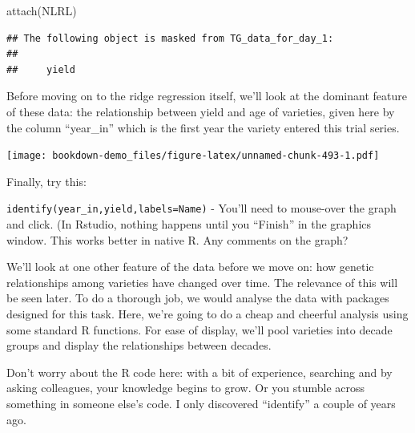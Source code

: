 \documentclass[
]{book}
\newenvironment{Shaded}{\begin{snugshade}}{\end{snugshade}}
\newcommand{\CommentTok}[1]{\textcolor[rgb]{0.56,0.35,0.01}{\textit{#1}}}
\newcommand{\FunctionTok}[1]{\textcolor[rgb]{0.00,0.00,0.00}{#1}}
\newcommand{\NormalTok}[1]{#1}
\newcommand{\SpecialCharTok}[1]{\textcolor[rgb]{0.00,0.00,0.00}{#1}}
\begin{document}
\begin{Shaded}
\begin{Highlighting}[]
\FunctionTok{attach}\NormalTok{(NLRL)}
\end{Highlighting}
\end{Shaded}

\begin{verbatim}
## The following object is masked from TG_data_for_day_1:
## 
##     yield
\end{verbatim}

Before moving on to the ridge regression itself, we'll look at the dominant feature of these data: the relationship between yield and age of varieties, given here by the column ``year\_in'' which is the first year the variety entered this trial series.

\begin{Shaded}
\end{Shaded}

\texttt{[image: bookdown-demo\_files/figure-latex/unnamed-chunk-493-1.pdf]}

Finally, try this:

\texttt{identify(year\_in,yield,labels=Name)} - You'll need to mouse-over the graph and click. (In Rstudio, nothing happens until you ``Finish'' in the graphics window. This works better in native R. Any comments on the graph?

We'll look at one other feature of the data before we move on: how genetic relationships
among varieties have changed over time. The relevance of this will be seen later. To do a thorough job, we would analyse the data with packages designed for this task. Here, we're going to do a cheap and cheerful analysis using some standard R functions. For ease of
display, we'll pool varieties into decade groups and display the relationships between
decades.

Don't worry about the R code here: with a bit of experience, searching and by asking
colleagues, your knowledge begins to grow. Or you stumble across something in someone else's code. I only discovered ``identify'' a couple of years ago.
\end{document}

